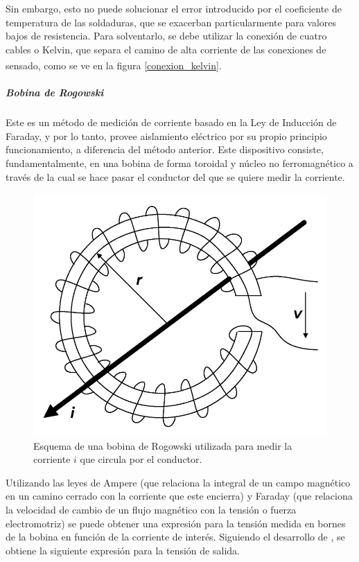 Sin embargo, esto no puede solucionar el error introducido por el coeficiente de temperatura de las soldaduras, que se exacerban particularmente para valores bajos de resistencia. Para solventarlo, se debe utilizar la conexión de cuatro cables o Kelvin, que separa el camino de alta corriente de las conexiones de sensado, como se ve en la figura \ref{conexion_kelvin}.\textsuperscript{\cite{CurrentSensing}}\\

\subparagraph{Bobina de Rogowski}

Este es un método de medición de corriente basado en la Ley de Inducción de Faraday, y por lo tanto, {\Medium provee aislamiento eléctrico} por su propio principio funcionamiento, a diferencia del método anterior. Este dispositivo consiste, fundamentalmente, en una bobina de forma toroidal y núcleo no ferromagnético a través de la cual se hace pasar el conductor del que se quiere medir la corriente.\\

\begin{figure}[h]
    \centering
    \includegraphics[scale=0.2]{Imagenes/Bobina Rogowski.png}
    \caption{Esquema de una bobina de Rogowski utilizada para medir la corriente $i$ que circula por el conductor.}
    \label{bobina_rogowski}
\end{figure}

Utilizando las leyes de Ampere (que relaciona la integral de un campo magnético en un camino cerrado con la corriente que este encierra) y Faraday (que relaciona la velocidad de cambio de un flujo magnético con la tensión o fuerza electromotriz) se puede obtener una expresión para la tensión medida en bornes de la bobina en función de la corriente de interés. Siguiendo el desarrollo de \cite{CurrentSensing}, se obtiene la siguiente expresión para la tensión de salida.

